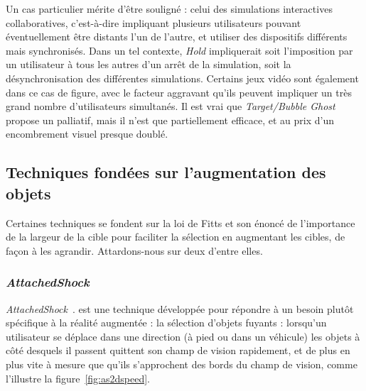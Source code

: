 	Un cas particulier mérite d'être souligné : celui des simulations interactives collaboratives, c'est-à-dire impliquant plusieurs utilisateurs pouvant éventuellement être distants l'un de l'autre, et utiliser des dispositifs différents mais synchronisés. Dans un tel contexte, \emph{Hold} impliquerait soit l'imposition par un utilisateur à tous les autres d'un arrêt de la simulation, soit la désynchronisation des différentes simulations. Certains jeux vidéo sont également dans ce cas de figure, avec le facteur aggravant qu'ils peuvent impliquer un très grand nombre d'utilisateurs simultanés. Il est vrai que \emph{Target/Bubble Ghost} propose un palliatif, mais il n'est que partiellement efficace, et au prix d'un encombrement visuel presque doublé.
	
	\subsection{Techniques fondées sur l'augmentation des objets}
	Certaines techniques se fondent sur la loi de Fitts et son énoncé de l'importance de la largeur de la cible pour faciliter la sélection en augmentant les cibles, de façon à les agrandir. Attardons-nous sur deux d'entre elles.

	\subsubsection{\emph{AttachedShock}}
	\emph{AttachedShock}~\cite{you2012attachedshock, you2014attachedshock}. est une technique développée pour répondre à un besoin plutôt spécifique à la réalité augmentée : la sélection d'objets \og fuyants \fg{} : lorsqu'un utilisateur se déplace dans une direction (à pied ou dans un véhicule) les objets à côté desquels il passent quittent son champ de vision rapidement, et de plus en plus vite à mesure que qu'ils s'approchent des bords du champ de vision, comme l'illustre la figure~\ref{fig:as2dspeed}.


